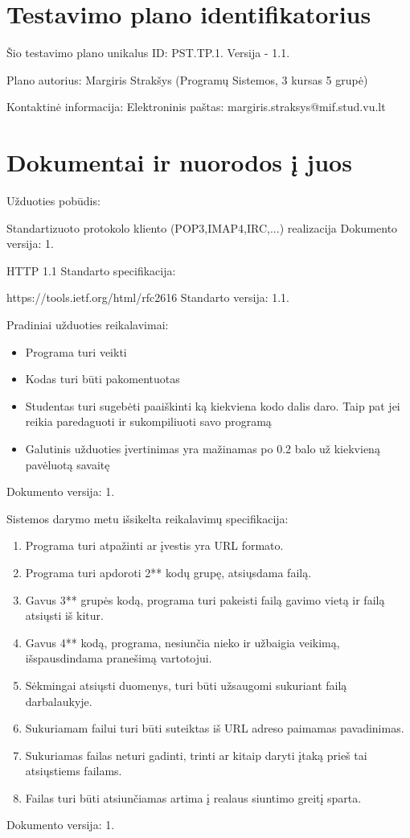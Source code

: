 
\section{Testavimo plano identifikatorius}

Šio testavimo plano unikalus ID: PST.TP.1.  Versija - 1.1.

Plano autorius: 
Margiris Strakšys (Programų Sistemos, 3 kursas 5 grupė)

Kontaktinė informacija:
Elektroninis paštas: margiris.straksys@mif.stud.vu.lt

\section{Dokumentai ir nuorodos į juos}

Užduoties pobūdis:

Standartizuoto protokolo kliento (POP3,IMAP4,IRC,...) realizacija
Dokumento versija: 1.

HTTP 1.1 Standarto specifikacija:

https://tools.ietf.org/html/rfc2616
Standarto versija: 1.1.

Pradiniai užduoties reikalavimai:

\begin{itemize}
	\item Programa turi veikti
	\item Kodas turi būti pakomentuotas
	\item Studentas turi sugebėti paaiškinti ką kiekviena kodo dalis daro. Taip pat jei reikia paredaguoti ir sukompiliuoti savo programą
	\item Galutinis užduoties įvertinimas yra mažinamas po 0.2 balo už kiekvieną pavėluotą savaitę
\end{itemize}
Dokumento versija: 1.

Sistemos darymo metu išsikelta reikalavimų specifikacija:

\begin{enumerate}
	\item Programa turi atpažinti ar įvestis yra URL formato.
	\item Programa turi apdoroti 2** kodų grupę, atsiųsdama failą.
	\item Gavus 3** grupės kodą, programa turi pakeisti failą gavimo vietą ir failą atsiųsti iš kitur.
	\item Gavus 4** kodą, programa, nesiunčia nieko ir užbaigia veikimą, išspausdindama pranešimą vartotojui.
	\item Sėkmingai atsiųsti duomenys, turi būti užsaugomi sukuriant failą darbalaukyje.
	\item Sukuriamam failui turi būti suteiktas iš URL adreso paimamas pavadinimas.
	\item Sukuriamas failas neturi gadinti, trinti ar kitaip daryti įtaką prieš tai atsiųstiems failams.
	\item Failas turi būti atsiunčiamas artima į realaus siuntimo greitį sparta.
\end{enumerate}
Dokumento versija: 1.


